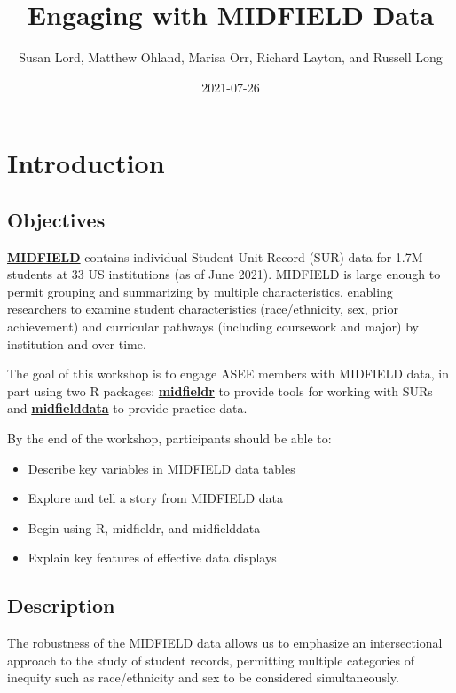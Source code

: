 \documentclass[
]{book}
\title{Engaging with MIDFIELD Data}
\author{Susan Lord, Matthew Ohland, Marisa Orr, Richard Layton, and Russell Long}
\date{2021-07-26}
\providecommand{\tightlist}{%
  \setlength{\itemsep}{0pt}\setlength{\parskip}{0pt}}
\begin{document}
\maketitle

{
\setcounter{tocdepth}{1}
\tableofcontents
}
\hypertarget{introduction}{%
\chapter{Introduction}\label{introduction}}

\hypertarget{objectives}{%
\section{Objectives}\label{objectives}}

\href{https://engineering.purdue.edu/MIDFIELD}{\textbf{MIDFIELD}} contains individual Student Unit Record (SUR) data for 1.7M students at 33 US institutions (as of June 2021). MIDFIELD is large enough to permit grouping and summarizing by multiple characteristics, enabling researchers to examine student characteristics (race/ethnicity, sex, prior achievement) and curricular pathways (including coursework and major) by institution and over time.

The goal of this workshop is to engage ASEE members with MIDFIELD data, in part using two R packages: \href{https://midfieldr.github.io/midfieldr/}{\textbf{midfieldr}} to provide tools for working with SURs and \href{https://midfieldr.github.io/midfielddata/}{\textbf{midfielddata}} to provide practice data.

By the end of the workshop, participants should be able to:

\begin{itemize}
\tightlist
\item
  Describe key variables in MIDFIELD data tables
\item
  Explore and tell a story from MIDFIELD data
\item
  Begin using R, midfieldr, and midfielddata\\
\item
  Explain key features of effective data displays
\end{itemize}

\hypertarget{description}{%
\section{Description}\label{description}}

The robustness of the MIDFIELD data allows us to emphasize an intersectional approach to the study of student records, permitting multiple categories of inequity such as race/ethnicity and sex to be considered simultaneously.
\end{document}
